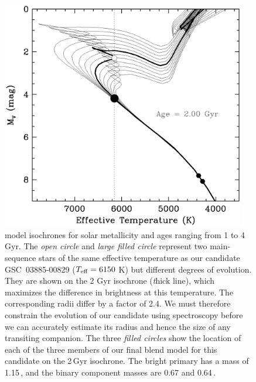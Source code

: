 \begin{figure}
\begin{center}
\includegraphics[width=0.95\textwidth]{3_f2}
\caption[Location of blend model components on isochrones]{\citet{Girardi_Bressan_Bertelli:aas:2000a} model isochrones
  for solar metallicity and ages ranging from 1 to 4 Gyr.
  The \textit{open circle} and \textit{large filled circle} represent two main-sequence stars of the same effective temperature as our candidate
  \mbox{GSC 03885-00829} ($T_{\rm eff} = 6150$ K) but different
  degrees of evolution. They are shown on the 2 Gyr isochrone ({\textit thick
  line}), which maximizes the difference in brightness at this
  temperature. The corresponding radii differ by a factor of 2.4. We
  must therefore constrain the evolution of our candidate using
  spectroscopy before we can accurately estimate its radius and hence
  the size of any transiting companion. The three \textit{filled circles} show
  the location of each of the three members of our final blend model
  for this candidate on the 2\,Gyr isochrone. The bright primary has a
  mass of 1.15\,\msun, and the binary component masses are
  0.67 and 0.64\,\msun.}\label{cha:gsc:fig:isochrones}
\end{center}
\end{figure}

